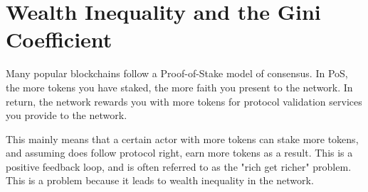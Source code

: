 \section{Wealth Inequality and the Gini Coefficient}

Many popular blockchains follow a Proof-of-Stake model of consensus. In PoS, the more tokens you have staked, the more faith you present to the network. In return, the network rewards you with more tokens for protocol validation services you provide to the network. 

This mainly means that a certain actor with more tokens can stake more tokens, and assuming does follow protocol right, earn more tokens as a result. This is a positive feedback loop, and is often referred to as the "rich get richer" problem. This is a problem because it leads to wealth inequality in the network.

